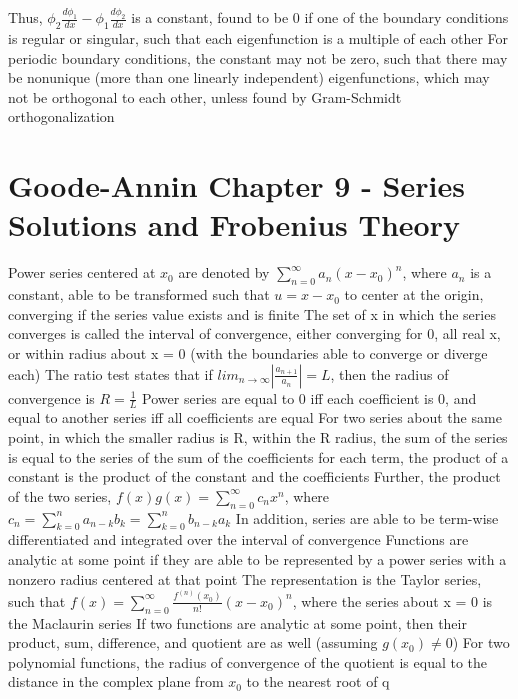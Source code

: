 \documentclass[11 pt, twoside]{article}
\newenvironment{outline*}
{
	\begin{outline}[enumerate]
	}
	{\end{outline}
}
\begin{document}
\begin{outline*}
		\3 Thus, $\phi_2\frac{d\phi_1}{dx} - \phi_1\frac{d\phi_2}{dx}$ is a constant, found to be 0 if one of the boundary conditions is regular or singular, such that each eigenfunction is a multiple of each other
		\3 For periodic boundary conditions, the constant may not be zero, such that there may be nonunique (more than one linearly independent) eigenfunctions, which may not be orthogonal to each other, unless found by Gram-Schmidt orthogonalization
\end{outline*}
\section{Goode-Annin Chapter 9 - Series Solutions and Frobenius Theory}
\begin{outline*}
\1 Power series centered at $x_0$ are denoted by $\sum_{n = 0}^{\infty} a_n(x - x_0)^n$, where $a_n$ is a constant, able to be transformed such that $u = x - x_0$ to center at the origin, converging if the series value exists and is finite
	\2 The set of x in which the series converges is called the interval of convergence, either converging for 0, all real x, or within radius about x = 0 (with the boundaries able to converge or diverge each)
	\2 The ratio test states that if $lim_{n \to \infty} |\frac{a_{n + 1}}{a_n}| = L$, then the radius of convergence is $R = \frac{1}{L}$
	\2 Power series are equal to 0 iff each coefficient is 0, and equal to another series iff all coefficients are equal
	\2 For two series about the same point, in which the smaller radius is R, within the R radius, the sum of the series is equal to the series of the sum of the coefficients for each term, the product of a constant is the product of the constant and the coefficients
		\3 Further, the product of the two series, $f(x)g(x) = \sum^{\infty}_{n = 0} c_nx^n$, where $c_n = \sum^n_{k = 0} a_{n-k}b_k = \sum^n_{k = 0} b_{n-k}a_k$
		\3 In addition, series are able to be term-wise differentiated and integrated over the interval of convergence
	\2 Functions are analytic at some point if they are able to be represented by a power series with a nonzero radius centered at that point
		\3 The representation is the Taylor series, such that $f(x) = \sum_{n = 0}^{\infty} \frac{f^{(n)}(x_0)}{n!}(x - x_0)^n$, where the series about x = 0 is the Maclaurin series
		\3 If two functions are analytic at some point, then their product, sum, difference, and quotient are as well (assuming $g(x_0) \neq 0$)
			\4 For two polynomial functions, the radius of convergence of the quotient is equal to the distance in the complex plane from $x_0$ to the nearest root of q

\end{outline*}
\end{document}
